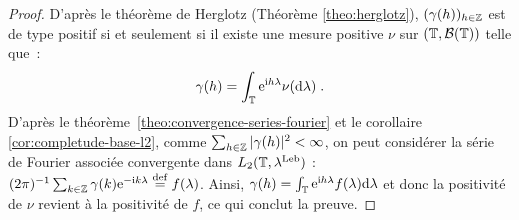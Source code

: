 \begin{proof}\smartqed
D'apr\`es le th\'eor\`eme de Herglotz (Th\'eor\`eme \ref{theo:herglotz}),
$(\gamma(h))_{h \in \mathbb{Z}}$ est de type
positif si et seulement si il existe une mesure positive
 $\nu$ sur $(\mathbb{T},\mathcal{B}(\mathbb{T}))$ telle que~:
\begin{eqnarray*}
 \gamma(h) = \int_{\mathbb{T}} \mathrm{e}^{\mathrm{i} h\lambda} \nu(\mathrm{d}\lambda)\; .
\end{eqnarray*}
D'apr\`es le th\'eor\`eme~\ref{theo:convergence-series-fourier} et le
corollaire \ref{cor:completude-base-l2}, comme $\sum_{h\in \mathbb{Z}} |\gamma(h)|^2<\infty$, on peut consid\'erer
la s\'erie de Fourier associ\'ee convergente dans
$L_2(\mathbb{T},\lambda^{\mathrm{Leb}})$ :
$(2\pi)^{-1} \sum_{k \in \mathbb{Z}} \gamma(k) \mathrm{e}^{-\mathrm{i} k
  \lambda}\stackrel{\mathrm{def}}{=} f(\lambda)$.
Ainsi, $\gamma(h) = \int_{\mathbb{T}} \mathrm{e}^{\mathrm{i} h\lambda} f(\lambda)\mathrm{d}\lambda$
et donc la positivit\'e de $\nu$ revient \`a la positivit\'e de $f$, ce qui
conclut la preuve.




\end{proof}
